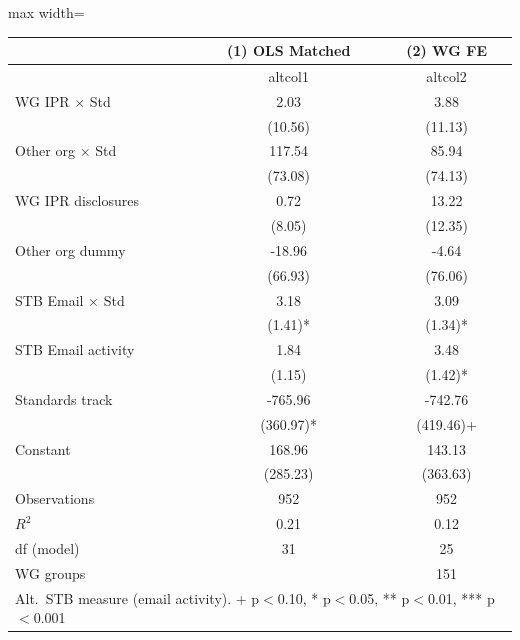\begin{adjustbox}{max width=\textwidth}
\begin{tabular}{lcc}
\toprule
 & (1) OLS Matched & (2) WG FE \\
\midrule
 & altcol1 & altcol2 \\
WG IPR $\times$ Std & 2.03 & 3.88 \\
 & (10.56) & (11.13) \\
Other org $\times$ Std & 117.54 & 85.94 \\
 & (73.08) & (74.13) \\
WG IPR disclosures & 0.72 & 13.22 \\
 & (8.05) & (12.35) \\
Other org dummy & -18.96 & -4.64 \\
 & (66.93) & (76.06) \\
STB Email $\times$ Std & 3.18 & 3.09 \\
 & (1.41)* & (1.34)* \\
STB Email activity & 1.84 & 3.48 \\
 & (1.15) & (1.42)* \\
Standards track & -765.96 & -742.76 \\
 & (360.97)* & (419.46)+ \\
Constant & 168.96 & 143.13 \\
 & (285.23) & (363.63) \\
\midrule
Observations & 952 & 952 \\
$R^2$ & 0.21 & 0.12 \\
df (model) & 31 & 25 \\
WG groups &  & 151 \\
\bottomrule
\multicolumn{3}{l}{\footnotesize Alt.\ STB measure (email activity). + p$<$0.10, * p$<$0.05, ** p$<$0.01, *** p$<$0.001} \\
\end{tabular}
\end{adjustbox}
